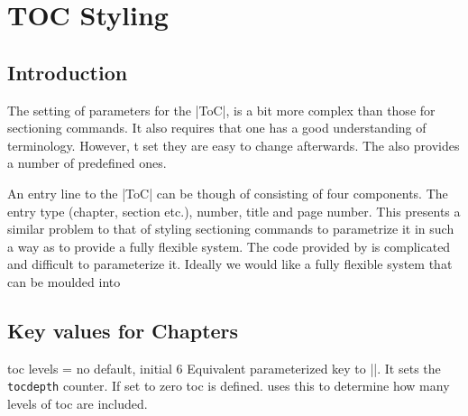 \chapter{TOC Styling}
\label{ch:toc}




\section{Introduction}

The setting of parameters for the |ToC|, is a bit more complex than those for sectioning commands. It also requires that one has a good understanding of \latexe terminology. However, t set they are easy to change afterwards.
The  also provides a number of predefined ones.

An entry line to the |ToC| can be though of consisting of four components. The entry type (chapter, section etc.), number, title and page number. This presents a similar problem to that of styling sectioning commands to parametrize it in such a way as to provide a fully flexible system. The code provided by \latexe is complicated and difficult to parameterize it. Ideally we would like a fully flexible system that can be moulded into  


%
%


\section{Key values for Chapters}


\begin{docKey}[phd]{toc levels}{ =  } {no default, initial 6}
 Equivalent parameterized key to |\toclevel|. It sets  the \texttt{tocdepth} counter. 
 If set to zero toc is defined. \latex uses this to determine how many levels of toc are included.
\end{docKey}

